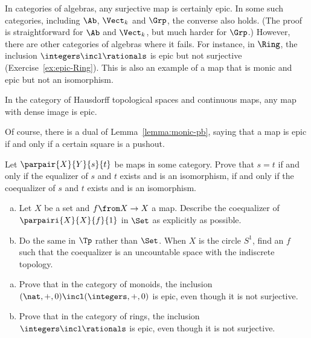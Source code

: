 \begin{example}
\label{eg:epic-alg}
In categories of algebras, any surjective map is certainly epic.  In some
such categories, including $\Ab$, $\Vect_k$%
%
%
and $\Grp$,%
%
%
the converse also holds.  (The proof is straightforward for $\Ab$ and
$\Vect_k$, but much harder for $\Grp$.)  However, there are other
categories of algebras where it fails.  For instance, in $\Ring$,%
%
%
the inclusion $\integers \incl \rationals$ is epic but not surjective
(Exercise~\ref{ex:epic-Ring}).  This is also an example of a map that is
monic and epic but not an isomorphism.
\end{example}

\begin{example}
In the category of Hausdorff topological spaces%
%
%
%
and continuous maps, any map with dense image is epic.
\end{example}

Of course, there is a dual of Lemma~\ref{lemma:monic-pb}, saying that a map is
epic if and only if a certain square is a pushout.


\exs


\begin{question}
Let $\parpair{X}{Y}{s}{t}$ be maps in some category.  Prove that $s = t$ if
and only if the equalizer of $s$ and $t$ exists and is an isomorphism, if
and only if the coequalizer of $s$ and $t$ exists and is an isomorphism.
\end{question}


\begin{question}
\begin{enumerate}[(b)]
\item 
Let $X$ be a set and $f\from X \to X$ a map.  Describe the coequalizer of
$\parpairi{X}{X}{f}{1}$ in $\Set$ as explicitly as possible. 

\item
Do the same in $\Tp$ rather than $\Set$.  When $X$ is the circle $S^1$,
find an $f$ such that the coequalizer is an uncountable space with the
indiscrete topology.
\end{enumerate}
\end{question}


\begin{question}        
\label{ex:epic-Ring}
\begin{enumerate}[(b)]
\item 
Prove that in the category of monoids,%
%
%
the inclusion $(\nat, +, 0) \incl (\integers, +, 0)$ is epic, even though
it is not surjective.

\item 
Prove that in the category of rings, the inclusion $\integers \incl
\rationals$ is epic, even though it is not surjective.
\end{enumerate}
\end{question}


